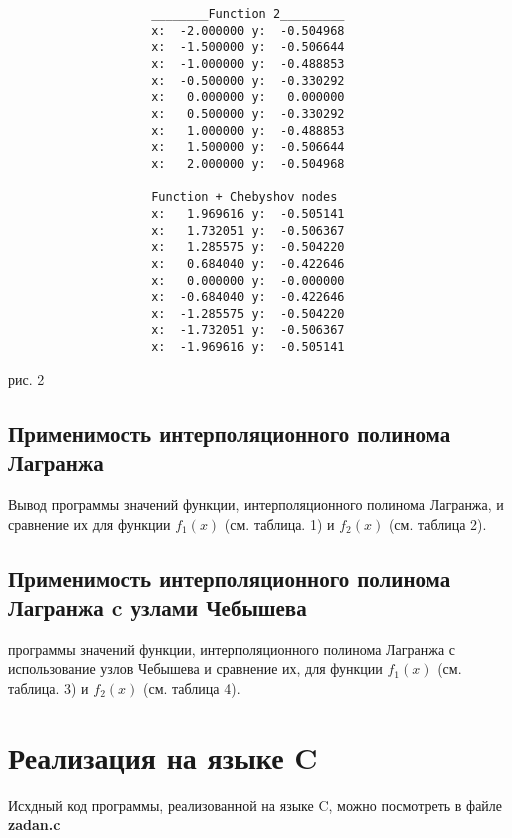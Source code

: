 \documentclass[13pt, a4paper, twoside]{article}
\begin{document}
\begin{verbatim}
                    ________Function 2_________
                    x:  -2.000000 y:  -0.504968
                    x:  -1.500000 y:  -0.506644
                    x:  -1.000000 y:  -0.488853
                    x:  -0.500000 y:  -0.330292
                    x:   0.000000 y:   0.000000
                    x:   0.500000 y:  -0.330292
                    x:   1.000000 y:  -0.488853
                    x:   1.500000 y:  -0.506644
                    x:   2.000000 y:  -0.504968
                    
                    Function + Chebyshov nodes
                    x:   1.969616 y:  -0.505141
                    x:   1.732051 y:  -0.506367
                    x:   1.285575 y:  -0.504220
                    x:   0.684040 y:  -0.422646
                    x:   0.000000 y:  -0.000000
                    x:  -0.684040 y:  -0.422646
                    x:  -1.285575 y:  -0.504220
                    x:  -1.732051 y:  -0.506367
                    x:  -1.969616 y:  -0.505141
\end{verbatim}
\begin{center}
  рис. 2
\end{center}

\subsection{Применимость интерполяционного полинома Лагранжа}
\tub Вывод программы значений функции, интерполяционного полинома Лагранжа, и сравнение их для функции $f_1(x)$ (см. таблица. 1) и $f_2(x)$ (см. таблица 2).







\subsection{Применимость интерполяционного полинома Лагранжа c узлами Чебышева}
 программы значений функции, интерполяционного полинома Лагранжа с использование узлов Чебышева и сравнение их, для функции $f_1(x)$ (см. таблица. 3) и $f_2(x)$ (см. таблица 4).





\section{Реализация на языке C}
\tub Исхдный код программы, реализованной на языке C, можно посмотреть в файле \textbf{zadan.c}
\end{document}
